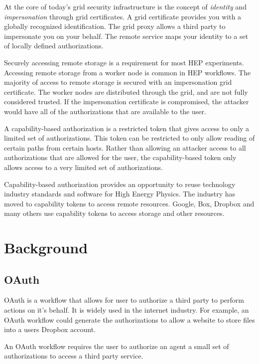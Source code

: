 \documentclass{webofc}
\begin{document}
At the core of today's grid security infrastructure is the concept of \textit{identity} and \textit{impersonation} through grid certificates. A grid certificate provides you with a globally recognized identification.  The grid proxy allows a third party to impersonate you on your behalf.  The remote service maps your identity to a set of locally defined authorizations.

Securely accessing remote storage is a requirement for most HEP experiments.  Accessing remote storage from a worker node is common in HEP workflows.  The majority of access to remote storage is secured with an impersonation grid certificate.  The worker nodes are distributed through the grid, and are not fully considered trusted.  If the impersonation certificate is compromised, the attacker would have all of the authorizations that are available to the user.

A capability-based authorization is a restricted token that gives access to only a limited set of authorizations.  This token can be restricted to only allow reading of certain paths from certain hosts.  Rather than allowing an attacker access to all authorizations that are allowed for the user, the capability-based token only allows access to a very limited set of authorizations.

Capability-based authorization provides an opportunity to reuse technology industry standards and software for High Energy Physics.  The industry has moved to capability tokens to access remote resources.  Google, Box, Dropbox and many others use capability tokens to access storage and other resources.

\section{Background}
\label{background}

\subsection{OAuth}
\label{sec:oauth}

OAuth is a workflow that allows for user to authorize a third party to perform actions on it's behalf.  It is widely used in the internet industry.  For example, an OAuth workflow could generate the authorizations to allow a website to store files into a users Dropbox account.

An OAuth workflow requires the user to authorize an agent a small set of authorizations to access a third party service.
\end{document}
